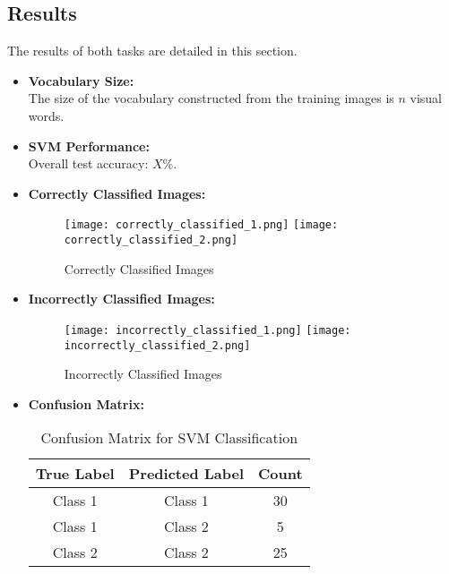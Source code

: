 \documentclass{article}
\begin{document}
\subsection{Results}
The results of both tasks are detailed in this section.
\begin{itemize}
    \item \textbf{Vocabulary Size:} \\
    The size of the vocabulary constructed from the training images is \( n \) visual words.

    \item \textbf{SVM Performance:} \\
    Overall test accuracy: \( X\% \).

    \item \textbf{Correctly Classified Images:} \\
    \begin{figure}[h]
        \centering
        \texttt{[image: correctly\_classified\_1.png]} %
        \texttt{[image: correctly\_classified\_2.png]} %
        \caption{Correctly Classified Images}
    \end{figure}

    \item \textbf{Incorrectly Classified Images:} \\
    \begin{figure}[h]
        \centering
        \texttt{[image: incorrectly\_classified\_1.png]} %
        \texttt{[image: incorrectly\_classified\_2.png]} %
        \caption{Incorrectly Classified Images}
    \end{figure}

    \item \textbf{Confusion Matrix:} \\
    \begin{table}[h]
        \centering
        \begin{tabular}{@{}ccc@{}}
            \toprule
            True Label & Predicted Label & Count \\ \midrule
            Class 1    & Class 1        & 30   \\
            Class 1    & Class 2        & 5    \\
            Class 2    & Class 2        & 25   \\
            \bottomrule
        \end{tabular}
        \caption{Confusion Matrix for SVM Classification}
    \end{table}
\end{itemize}
\end{document}
